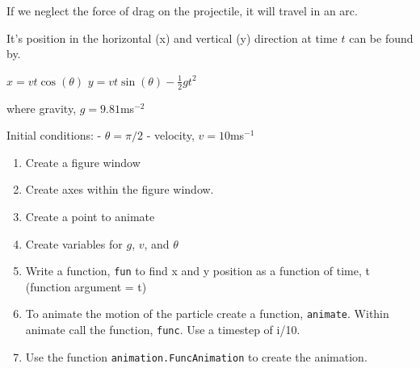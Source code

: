 \documentclass[11pt]{article}
\providecommand{\tightlist}{%
      \setlength{\itemsep}{0pt}\setlength{\parskip}{0pt}}
\begin{document}
If we neglect the force of drag on the projectile, it will travel in an
arc.

It's position in the horizontal (x) and vertical (y) direction at time
\(t\) can be found by.

\(x= vt\cos(\theta)\) \(y= vt\sin(\theta) - \frac{1}{2}gt^2\)

where gravity, \(g=9.81\)ms\(^{-2}\)

Initial conditions: - \(\theta = \pi/2\) - velocity, \(v=10\)ms\(^{-1}\)

    \begin{enumerate}
\def\labelenumi{\arabic{enumi}.}
\tightlist
\item
  Create a figure window
\item
  Create axes within the figure window.
\item
  Create a point to animate
\item
  Create variables for \(g\), \(v\), and \(\theta\)
\item
  Write a function, \texttt{fun} to find x and y position as a function
  of time, t (function argument = t)
\item
  To animate the motion of the particle create a function,
  \texttt{animate}. Within animate call the function, \texttt{func}. Use
  a timestep of i/10.
\item
  Use the function \texttt{animation.FuncAnimation} to create the
  animation.
\end{enumerate}
\end{document}
